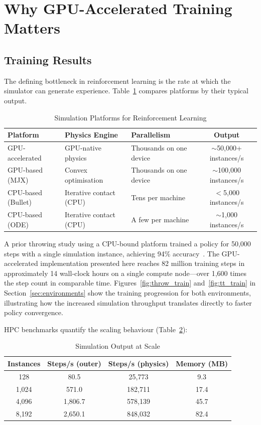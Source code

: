 \documentclass[11pt, a4paper]{article}
\begin{document}
\section{Why GPU-Accelerated Training Matters}
\label{sec:advantage}

\subsection{Training Results}

The defining bottleneck in reinforcement learning is the rate at which the simulator can generate experience. Table~\ref{tab:sim_comparison} compares platforms by their typical output.

\begin{table}[H]
\centering
\caption{Simulation Platforms for Reinforcement Learning}
\label{tab:sim_comparison}
\begin{tabularx}{\textwidth}{@{} l l l c @{}}
\toprule
\textbf{Platform} & \textbf{Physics Engine} & \textbf{Parallelism} & \textbf{Output} \\
\midrule
GPU-accelerated & GPU-native physics & Thousands on one device & $\sim$50,000+ instances/s \\
GPU-based (MJX) & Convex optimisation & Thousands on one device & $\sim$100,000 instances/s \\
CPU-based (Bullet) & Iterative contact (CPU) & Tens per machine & $<$5,000 instances/s \\
CPU-based (ODE) & Iterative contact (CPU) & A few per machine & $\sim$1,000 instances/s \\
\bottomrule
\end{tabularx}
\end{table}

A prior throwing study using a CPU-bound platform trained a policy for 50,000 steps with a single simulation instance, achieving 94\% accuracy~\cite{kasaei2023learning}. The GPU-accelerated implementation presented here reaches 82 million training steps in approximately 14 wall-clock hours on a single compute node---over 1,600 times the step count in comparable time. Figures~\ref{fig:throw_train} and~\ref{fig:tt_train} in Section~\ref{sec:environments} show the training progression for both environments, illustrating how the increased simulation throughput translates directly to faster policy convergence.

HPC benchmarks quantify the scaling behaviour (Table~\ref{tab:scalability}):

\begin{table}[H]
\centering
\caption{Simulation Output at Scale}
\label{tab:scalability}
\begin{tabular}{@{} c c c c @{}}
\toprule
\textbf{Instances} & \textbf{Steps/s (outer)} & \textbf{Steps/s (physics)} & \textbf{Memory (MB)} \\
\midrule
128   & 80.5   & 25,773  & 9.3  \\
1,024 & 571.0  & 182,711 & 17.4 \\
4,096 & 1,806.7 & 578,139 & 45.7 \\
8,192 & 2,650.1 & 848,032 & 82.4 \\
\bottomrule
\end{tabular}
\end{table}
\end{document}
